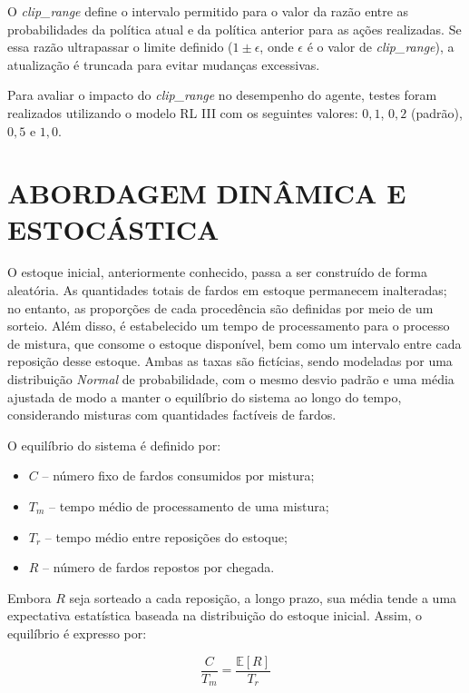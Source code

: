 \documentclass[
    12pt,                %
    openright,           %
    oneside,             %
    a4paper,             %
    english,             %
    spanish,             %
    brazil               %
]{ufscar}
\begin{document}
O \textit{clip\_range} define o intervalo permitido para o valor da razão entre as probabilidades da política atual e da política anterior para as ações realizadas. Se essa razão ultrapassar o limite definido (\(1 \pm \epsilon\), onde \(\epsilon\) é o valor de \textit{clip\_range}), a atualização é truncada para evitar mudanças excessivas.

Para avaliar o impacto do \textit{clip\_range} no desempenho do agente, testes foram realizados utilizando o modelo RL III com os seguintes valores: \(0,1\), \(0,2\) (padrão), \(0,5\) e \(1,0\). 

\section{ABORDAGEM DINÂMICA E ESTOCÁSTICA}

O estoque inicial, anteriormente conhecido, passa a ser construído de forma aleatória. As quantidades totais de fardos em estoque permanecem inalteradas; no entanto, as proporções de cada procedência são definidas por meio de um sorteio. Além disso, é estabelecido um tempo de processamento para o processo de mistura, que consome o estoque disponível, bem como um intervalo entre cada reposição desse estoque. Ambas as taxas são fictícias, sendo modeladas por uma distribuição \textit{Normal} de probabilidade, com o mesmo desvio padrão e uma média ajustada de modo a manter o equilíbrio do sistema ao longo do tempo, considerando misturas com quantidades factíveis de fardos.

O equilíbrio do sistema é definido por:

\begin{itemize}
    \item \( C \) – número fixo de fardos consumidos por mistura;
    \item \( T_m \) – tempo médio de processamento de uma mistura;
    \item \( T_r \) – tempo médio entre reposições do estoque;
    \item \( R \) – número de fardos repostos por chegada.
\end{itemize}

Embora \( R \) seja sorteado a cada reposição, a longo prazo, sua média tende a uma expectativa estatística baseada na distribuição do estoque inicial. Assim, o equilíbrio é expresso por:

\begin{equation}
    \frac{C}{T_m} = \frac{\mathbb{E}[R]}{T_r}
\end{equation}
\end{document}
